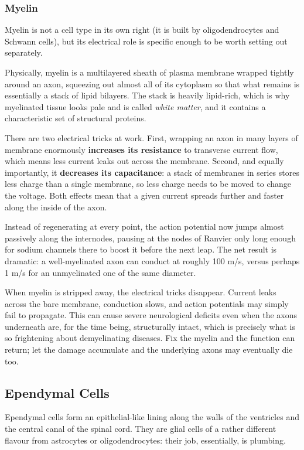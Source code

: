 \documentclass[11pt]{article}
\begin{document}
\subsubsection{Myelin}

Myelin is not a cell type in its own right (it is built by oligodendrocytes and Schwann cells), but its electrical role is specific enough to be worth setting out separately.

Physically, myelin is a multilayered sheath of plasma membrane wrapped tightly around an axon, squeezing out almost all of its cytoplasm so that what remains is essentially a stack of lipid bilayers. The stack is heavily lipid-rich, which is why myelinated tissue looks pale and is called \textit{white matter}, and it contains a characteristic set of structural proteins.

There are two electrical tricks at work. First, wrapping an axon in many layers of membrane enormously \textbf{increases its resistance} to transverse current flow, which means less current leaks out across the membrane. Second, and equally importantly, it \textbf{decreases its capacitance}: a stack of membranes in series stores less charge than a single membrane, so less charge needs to be moved to change the voltage. Both effects mean that a given current spreads further and faster along the inside of the axon.

Instead of regenerating at every point, the action potential now jumps almost passively along the internodes, pausing at the nodes of Ranvier only long enough for sodium channels there to boost it before the next leap. The net result is dramatic: a well-myelinated axon can conduct at roughly 100 m/s, versus perhaps 1 m/s for an unmyelinated one of the same diameter.

When myelin is stripped away, the electrical tricks disappear. Current leaks across the bare membrane, conduction slows, and action potentials may simply fail to propagate. This can cause severe neurological deficits even when the axons underneath are, for the time being, structurally intact, which is precisely what is so frightening about demyelinating diseases. Fix the myelin and the function can return; let the damage accumulate and the underlying axons may eventually die too.

\subsection{Ependymal Cells}

Ependymal cells form an epithelial-like lining along the walls of the ventricles and the central canal of the spinal cord. They are glial cells of a rather different flavour from astrocytes or oligodendrocytes: their job, essentially, is plumbing.
\end{document}
